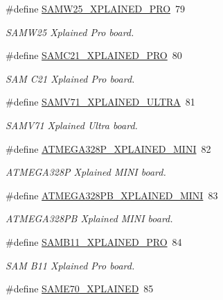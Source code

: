 \begin{DoxyCompactItemize}
\#define \mbox{\hyperlink{group__group__common__boards_ga7b175e5ef388a7ecc2a76035003d27cd}{S\+A\+M\+W25\+\_\+\+X\+P\+L\+A\+I\+N\+E\+D\+\_\+\+P\+RO}}~79
\begin{DoxyCompactList}\small\item\em S\+A\+M\+W25 Xplained Pro board. \end{DoxyCompactList}\item 
\#define \mbox{\hyperlink{group__group__common__boards_gaab91b16ed61441fc1c048fb6f6aa50d7}{S\+A\+M\+C21\+\_\+\+X\+P\+L\+A\+I\+N\+E\+D\+\_\+\+P\+RO}}~80
\begin{DoxyCompactList}\small\item\em S\+AM C21 Xplained Pro board. \end{DoxyCompactList}\item 
\#define \mbox{\hyperlink{group__group__common__boards_ga373b1689d08782aaa2edb8d3eac814a5}{S\+A\+M\+V71\+\_\+\+X\+P\+L\+A\+I\+N\+E\+D\+\_\+\+U\+L\+T\+RA}}~81
\begin{DoxyCompactList}\small\item\em S\+A\+M\+V71 Xplained Ultra board. \end{DoxyCompactList}\item 
\#define \mbox{\hyperlink{group__group__common__boards_ga67a83231641bdefdc8a27565d50c82db}{A\+T\+M\+E\+G\+A328\+P\+\_\+\+X\+P\+L\+A\+I\+N\+E\+D\+\_\+\+M\+I\+NI}}~82
\begin{DoxyCompactList}\small\item\em A\+T\+M\+E\+G\+A328P Xplained M\+I\+NI board. \end{DoxyCompactList}\item 
\#define \mbox{\hyperlink{group__group__common__boards_ga26330ad1839acf2f969b5086e6d9687c}{A\+T\+M\+E\+G\+A328\+P\+B\+\_\+\+X\+P\+L\+A\+I\+N\+E\+D\+\_\+\+M\+I\+NI}}~83
\begin{DoxyCompactList}\small\item\em A\+T\+M\+E\+G\+A328\+PB Xplained M\+I\+NI board. \end{DoxyCompactList}\item 
\#define \mbox{\hyperlink{group__group__common__boards_gae16d7ca5c2f627f3e0bfa25bae0c1a4d}{S\+A\+M\+B11\+\_\+\+X\+P\+L\+A\+I\+N\+E\+D\+\_\+\+P\+RO}}~84
\begin{DoxyCompactList}\small\item\em S\+AM B11 Xplained Pro board. \end{DoxyCompactList}\item 
\#define \mbox{\hyperlink{group__group__common__boards_ga1d6690b8a7ec71eb270351a80bfe6e1f}{S\+A\+M\+E70\+\_\+\+X\+P\+L\+A\+I\+N\+ED}}~85

\end{DoxyCompactItemize}
